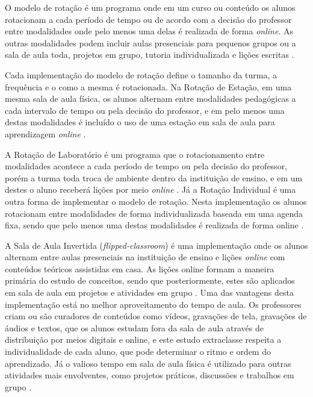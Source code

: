 
O modelo de rotação é um programa onde em um curso ou conteúdo os alunos rotacionam a cada período de tempo ou de acordo com a decisão do professor entre modalidades onde pelo menos uma delas é realizada de forma \emph{online}. As outras modalidades podem incluir aulas presenciais para pequenos grupos ou a sala de aula toda, projetos em grupo, tutoria individualizada e lições escritas \cite{staker_classifying_2012}.

Cada implementação do modelo de rotação define o tamanho da turma, a frequência e o como a mesma é rotacionada. Na Rotação de Estação, em uma mesma sala de aula física, os alunos alternam entre modalidades pedagógicas a cada intervalo de tempo ou pela decisão do professor, e em pelo menos uma destas modalidades é incluído o uso de uma estação em sala de aula para aprendizagem \emph{online} \cite{staker_classifying_2012}.

A Rotação de Laboratório é um programa que o rotacionamento entre modalidades acontece a cada período de tempo ou pela decisão do professor, porém a turma toda troca de ambiente dentro da instituição de ensino, e em um destes o aluno receberá lições por meio \emph{online} \cite{staker_classifying_2012}. Já a Rotação Individual é uma outra forma de implementar o modelo de rotação. Nesta implementação os alunos rotacionam entre modalidades de forma individualizada baseada em uma agenda fixa, sendo que pelo menos uma destas modalidades é realizada de forma online \cite{staker_classifying_2012}.

A Sala de Aula Invertida (\emph{flipped-classroom}) é uma implementação onde os alunos alternam entre aulas presenciais na instituição de ensino e lições \emph{online} com conteúdos teóricos assistidas em casa. As lições online formam a maneira primária do estudo de conceitos, sendo que posteriormente, estes são aplicados em sala de aula em projetos e atividades em grupo \cite{staker_classifying_2012}. Uma das vantagens desta implementação está no melhor aproveitamento do tempo de aula. Os professores criam ou são curadores de conteúdos como vídeos, gravações de tela, gravações de áudios e textos, que os alunos estudam fora da sala de aula através de distribuição por meios digitais e online, e este estudo extraclasse respeita a individualidade de cada aluno, que pode determinar o ritmo e ordem do aprendizado. Já o valioso tempo em sala de aula física é utilizado para outras atividades mais envolventes, como projetos práticos, discussões e trabalhos em grupo \cite{milman_flipped_2012}.

